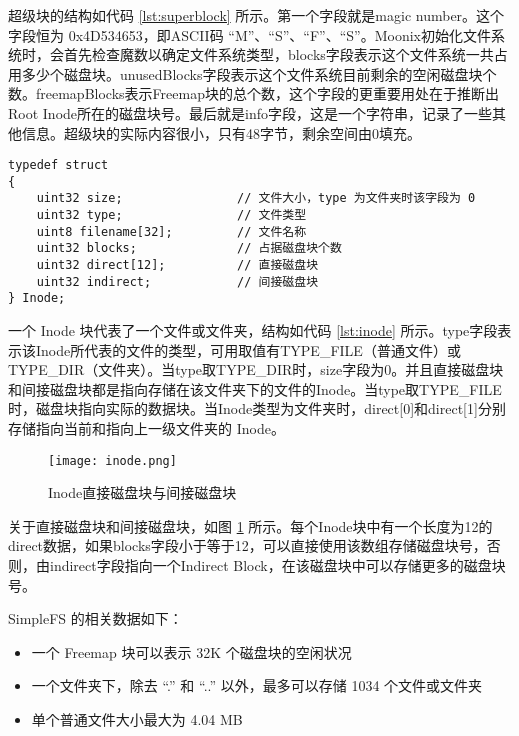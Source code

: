 超级块的结构如代码 \ref{lst:superblock} 所示。第一个字段就是magic number。这个字段恒为 0x4D534653，即ASCII码 “M”、“S”、“F”、“S”。Moonix初始化文件系统时，会首先检查魔数以确定文件系统类型，blocks字段表示这个文件系统一共占用多少个磁盘块。unusedBlocks字段表示这个文件系统目前剩余的空闲磁盘块个数。freemapBlocks表示Freemap块的总个数，这个字段的更重要用处在于推断出Root Inode所在的磁盘块号。最后就是info字段，这是一个字符串，记录了一些其他信息。超级块的实际内容很小，只有48字节，剩余空间由0填充。

\begin{minipage}[c]{0.95\textwidth}
\begin{lstlisting}[language={moonix}, caption={SimpleFS Inode结构}, label={lst:inode}]
typedef struct
{
	uint32 size;                // 文件大小，type 为文件夹时该字段为 0
	uint32 type;                // 文件类型
	uint8 filename[32];         // 文件名称
	uint32 blocks;              // 占据磁盘块个数
	uint32 direct[12];          // 直接磁盘块
	uint32 indirect;            // 间接磁盘块
} Inode;
\end{lstlisting}
\end{minipage}

一个 Inode 块代表了一个文件或文件夹，结构如代码 \ref{lst:inode} 所示。type字段表示该Inode所代表的文件的类型，可用取值有TYPE\_FILE（普通文件）或TYPE\_DIR（文件夹）。当type取TYPE\_DIR时，size字段为0。并且直接磁盘块和间接磁盘块都是指向存储在该文件夹下的文件的Inode。当type取TYPE\_FILE时，磁盘块指向实际的数据块。当Inode类型为文件夹时，direct[0]和direct[1]分别存储指向当前和指向上一级文件夹的 Inode。

\begin{figure}[htpb]
	\centering
	\texttt{[image: inode.png]}
	\setlength{\abovecaptionskip}{2pt}
	\caption{Inode直接磁盘块与间接磁盘块}
	\label{pic:inode}
\end{figure}

关于直接磁盘块和间接磁盘块，如图 \ref{pic:inode} 所示。每个Inode块中有一个长度为12的direct数据，如果blocks字段小于等于12，可以直接使用该数组存储磁盘块号，否则，由indirect字段指向一个Indirect Block，在该磁盘块中可以存储更多的磁盘块号。

SimpleFS 的相关数据如下：

\begin{itemize}
	\item 一个 Freemap 块可以表示 32K 个磁盘块的空闲状况
	\item 一个文件夹下，除去 “.” 和 “..” 以外，最多可以存储 1034 个文件或文件夹
	\item 单个普通文件大小最大为 4.04 MB
\end{itemize}

